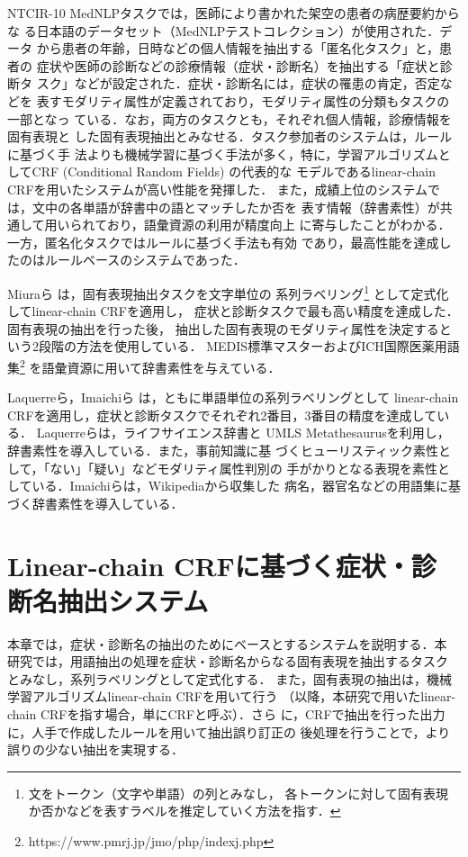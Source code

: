 \documentclass[japanese]{jnlp_1.4}
\begin{document}
NTCIR-10 MedNLPタスクでは，医師により書かれた架空の患者の病歴要約からな
る日本語のデータセット（MedNLPテストコレクション）が使用された．データ
から患者の年齢，日時などの個人情報を抽出する「匿名化タスク」と，患者の
症状や医師の診断などの診療情報（症状・診断名）を抽出する「症状と診断タ
スク」などが設定された．症状・診断名には，症状の罹患の肯定，否定などを
表すモダリティ属性が定義されており，モダリティ属性の分類もタスクの一部となっ
ている．なお，両方のタスクとも，それぞれ個人情報，診療情報を固有表現と
した固有表現抽出とみなせる．タスク参加者のシステムは，ルールに基づく手
法よりも機械学習に基づく手法が多く，特に，学習アルゴリズムとしてCRF
(Conditional Random Fields) \cite{lafferty2001conditional} の代表的な
モデルであるlinear-chain CRFを用いたシステムが高い性能を発揮した．
また，成績上位のシステムでは，文中の各単語が辞書中の語とマッチしたか否を
表す情報（辞書素性）が共通して用いられており，語彙資源の利用が精度向上
に寄与したことがわかる．一方，匿名化タスクではルールに基づく手法も有効
であり，最高性能を達成したのはルールベースのシステムであった．

Miuraら\cite{miura2013incorporating} は，固有表現抽出タスクを文字単位の
系列ラベリング\footnote{文をトークン（文字や単語）の列とみなし，
各トークンに対して固有表現か否かなどを表すラベルを推定していく方法を指す．}
として定式化してlinear-chain CRFを適用し，
症状と診断タスクで最も高い精度を達成した．固有表現の抽出を行った後，
抽出した固有表現のモダリティ属性を決定するという2段階の方法を使用している．
MEDIS標準マスターおよびICH国際医薬用語集\footnote{https://www.pmrj.jp/jmo/php/indexj.php}
を語彙資源に用いて辞書素性を与えている．

Laquerreら\cite{laquerre2013necla}，Imaichiら
\cite{imaichi2013comparison} は，ともに単語単位の系列ラベリングとして
linear-chain CRFを適用し，症状と診断タスクでそれぞれ2番目，3番目の精度を達成している．
Laquerreらは，ライフサイエンス辞書と
UMLS Metathesaurusを利用し，辞書素性を導入している．また，事前知識に基
づくヒューリスティック素性として，「ない」「疑い」などモダリティ属性判別の
手がかりとなる表現を素性としている．Imaichiらは，Wikipediaから収集した
病名，器官名などの用語集に基づく辞書素性を導入している．


\section{Linear-chain CRFに基づく症状・診断名抽出システム}
\label{chp:baseline_system}

本章では，症状・診断名の抽出のためにベースとするシステムを説明する．本
研究では，用語抽出の処理を症状・診断名からなる固有表現を抽出するタスク
とみなし，系列ラベリングとして定式化する．
また，固有表現の抽出は，機械学習アルゴリズムlinear-chain CRFを用いて行う
（以降，本研究で用いたlinear-chain CRFを指す場合，単にCRFと呼ぶ）．さら
に，CRFで抽出を行った出力に，人手で作成したルールを用いて抽出誤り訂正の
後処理を行うことで，より誤りの少ない抽出を実現する．
\end{document}
